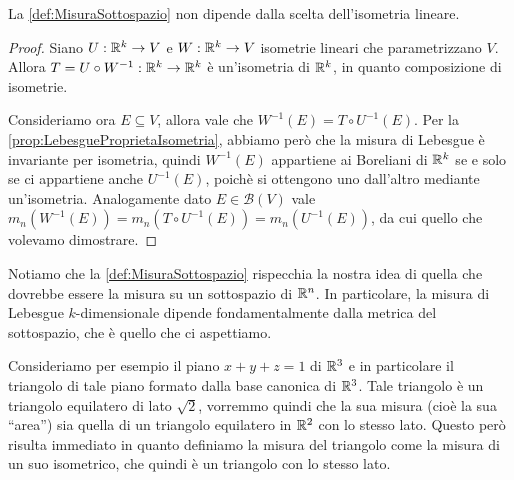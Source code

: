\begin{remark}
	La \cref{def:MisuraSottospazio} non dipende dalla scelta dell'isometria lineare.
\end{remark}
\begin{proof}
	Siano $U:\mathbb R^k\to V$ e $W:\mathbb R^k\to V$ isometrie lineari che parametrizzano $V$. Allora $T=U\circ W^{-1}:\mathbb R^k\to\mathbb R^k$ è un'isometria di $\mathbb R^k$, in quanto composizione di isometrie.
	
	Consideriamo ora $E\subseteq V$, allora vale che $W^{-1}(E)=T\circ U^{-1}(E)$. Per la \cref{prop:LebesgueProprietaIsometria}, abbiamo però che la misura di Lebesgue è invariante per isometria, quindi $W^{-1}(E)$ appartiene ai Boreliani di $\mathbb R^k$ se e solo se ci appartiene anche $U^{-1}(E)$, poichè si ottengono uno dall'altro mediante un'isometria. Analogamente dato $E\in\mathcal{B}(V)$ vale $m_n(W^{-1}(E))=m_n(T\circ U^{-1}(E))=m_n(U^{-1}(E))$, da cui quello che volevamo dimostrare.
\end{proof}

Notiamo che la \cref{def:MisuraSottospazio} rispecchia la nostra idea di quella che dovrebbe essere la misura su un sottospazio di $\mathbb R^n$. In particolare, la misura di Lebesgue $k$-dimensionale dipende fondamentalmente dalla metrica del sottospazio, che è quello che ci aspettiamo.

Consideriamo per esempio il piano $x+y+z=1$ di $\mathbb R^3$ e in particolare il triangolo di tale piano formato dalla base canonica di $\mathbb R^3$. Tale triangolo è un triangolo equilatero di lato $\sqrt{2}$, vorremmo quindi che la sua misura (cioè la sua ``area'') sia quella di un triangolo equilatero in $\mathbb R^2$ con lo stesso lato. Questo però risulta immediato in quanto definiamo la misura del triangolo come la misura di un suo isometrico, che quindi è un triangolo con lo stesso lato.


